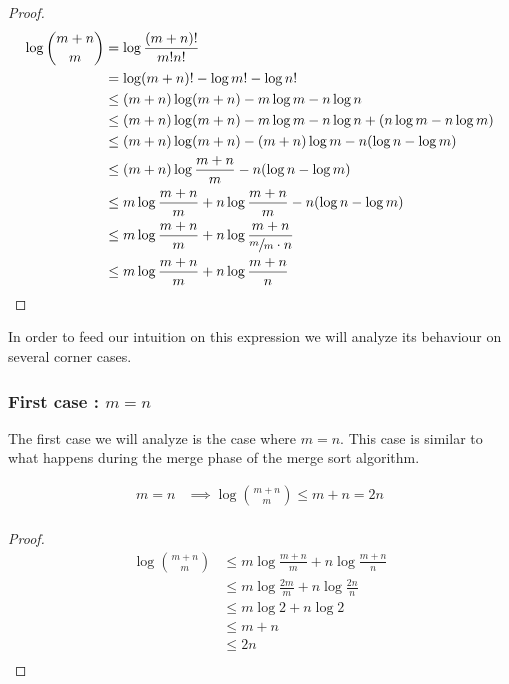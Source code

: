 \begin{proof}
\begin{align*}
\log\binom{m+n}{m} &= \log\frac{(m+n)!}{m!n!}\\
&= \log(m+n)! - \log m! - \log n!\\
&\leq (m+n) \log(m+n) - m \log m - n \log n\\
&\leq (m+n) \log(m+n) - m \log m - n \log n + (n \log m - n \log m)\\
&\leq (m+n) \log(m+n) - (m+n) \log m - n (\log n - \log m)\\
&\leq (m+n) \log\frac{m+n}{m} - n (\log n - \log m)\\
&\leq m \log\frac{m+n}{m} + n \log\frac{m+n}{m} - n (\log n - \log m)\\
&\leq m \log\frac{m+n}{m} + n \log\frac{m+n}{\sfrac{m}{m} \cdot n}\\
&\leq m \log\frac{m+n}{m} + n \log\frac{m+n}{n}\\
\end{align*}
\end{proof}



In order to feed our intuition on this expression we will analyze its behaviour on several corner cases.


\subsubsection{First case\texorpdfstring{ : $m = n$}{}}


The first case we will analyze is the case where $m = n$. This case is similar to what happens during the merge phase of the merge sort algorithm.

\begin{lemma}
\begin{align*}
m = n &\implies \log\binom{m+n}{m} \leq m + n = 2n\\
\end{align*}
\end{lemma}

\begin{proof}
\begin{align*}
\log\binom{m+n}{m} &\leq m \log\frac{m+n}{m} + n \log\frac{m+n}{n}\\
&\leq m \log\frac{2m}{m} + n \log\frac{2n}{n}\\
&\leq m \log 2 + n \log 2\\
&\leq m + n\\
&\leq 2n\\
\end{align*}
\end{proof}

